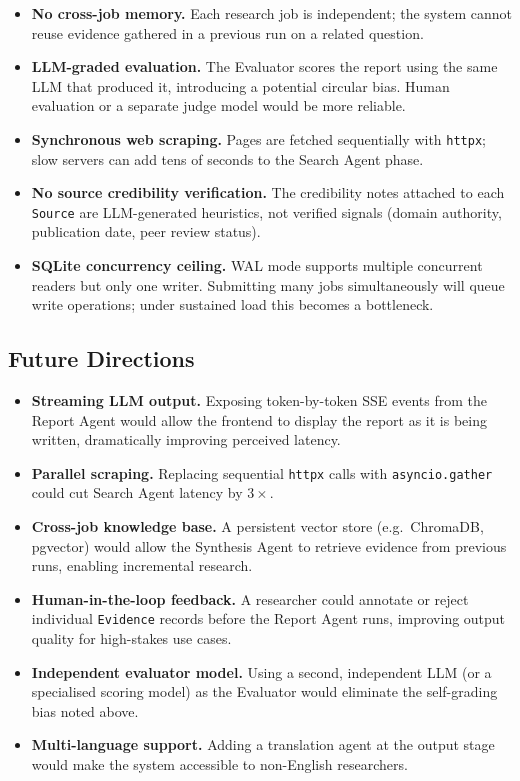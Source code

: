 \documentclass[10pt, twocolumn]{article}
\begin{document}
\begin{itemize}
  \item \textbf{No cross-job memory.} Each research job is independent;
    the system cannot reuse evidence gathered in a previous run on a related
    question.
  \item \textbf{LLM-graded evaluation.} The Evaluator scores the report using
    the same LLM that produced it, introducing a potential circular bias.
    Human evaluation or a separate judge model would be more reliable.
  \item \textbf{Synchronous web scraping.} Pages are fetched sequentially
    with \texttt{httpx}; slow servers can add tens of seconds to the Search
    Agent phase.
  \item \textbf{No source credibility verification.} The credibility notes
    attached to each \texttt{Source} are LLM-generated heuristics, not verified
    signals (domain authority, publication date, peer review status).
  \item \textbf{SQLite concurrency ceiling.} WAL mode supports multiple
    concurrent readers but only one writer. Submitting many jobs simultaneously
    will queue write operations; under sustained load this becomes a bottleneck.
\end{itemize}

\subsection{Future Directions}

\begin{itemize}
  \item \textbf{Streaming LLM output.} Exposing token-by-token SSE events
    from the Report Agent would allow the frontend to display the report as
    it is being written, dramatically improving perceived latency.
  \item \textbf{Parallel scraping.} Replacing sequential \texttt{httpx} calls
    with \texttt{asyncio.gather} could cut Search Agent latency by $3\times$.
  \item \textbf{Cross-job knowledge base.} A persistent vector store (e.g.\
    ChromaDB, pgvector) would allow the Synthesis Agent to retrieve evidence
    from previous runs, enabling incremental research.
  \item \textbf{Human-in-the-loop feedback.} A researcher could annotate or
    reject individual \texttt{Evidence} records before the Report Agent runs,
    improving output quality for high-stakes use cases.
  \item \textbf{Independent evaluator model.} Using a second, independent LLM
    (or a specialised scoring model) as the Evaluator would eliminate the
    self-grading bias noted above.
  \item \textbf{Multi-language support.} Adding a translation agent at the
    output stage would make the system accessible to non-English researchers.
\end{itemize}
\end{document}
